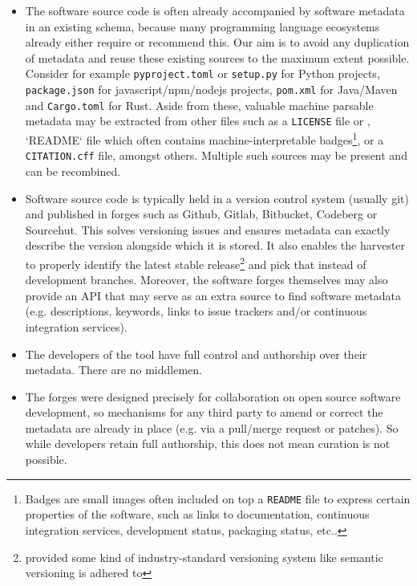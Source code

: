 \documentclass[a4paper,11pt]{article}
\begin{document}
\begin{itemize}
\item The software source code is often already accompanied by software metadata in an existing schema,
  because many programming language ecosystems already either require or recommend this. Our aim is 
  to avoid any duplication of metadata and reuse these existing sources to the maximum extent possible.
  Consider for example \texttt{pyproject.toml} or \texttt{setup.py} for Python projects, \texttt{package.json} for javascript/npm/nodejs projects,
        \texttt{pom.xml} for Java/Maven and \texttt{Cargo.toml} for Rust. Aside from these, valuable machine parsable metadata may be extracted from other files such as a \texttt{LICENSE} file or 
        , `README` file which often contains machine-interpretable badges\footnote{Badges are small images often included on top a \texttt{README} file to express certain properties of the software, such as links to documentation, continuous integration services, development status, packaging status, etc..}, or a \texttt{CITATION.cff} file, amongst others.
  Multiple such sources may be present and can be recombined.
\item Software source code is typically held in a version control system (usually git) and published in 
  forges such as Github, Gitlab, Bitbucket, Codeberg or Sourcehut. This solves versioning
  issues and ensures metadata can exactly describe the version alongside which it is stored. It also enables the 
  harvester to properly identify the latest stable release\footnote{provided some kind of industry-standard versioning system like semantic versioning is adhered to} and pick that instead of development branches.
  Moreover, the software forges themselves may also provide an API that may serve as an extra source to find software metadata (e.g. descriptions, keywords, links to issue trackers and/or continuous integration services).
\item The developers of the tool have full control and authorship over their metadata. There are no middlemen.
\item The forges were designed precisely for collaboration on open source software development, so mechanisms for any
  third party to amend or correct the metadata are already in place (e.g. via a pull/merge request or patches).
  So while developers retain full authorship, this does not mean curation is not possible.
\end{itemize}
\end{document}
